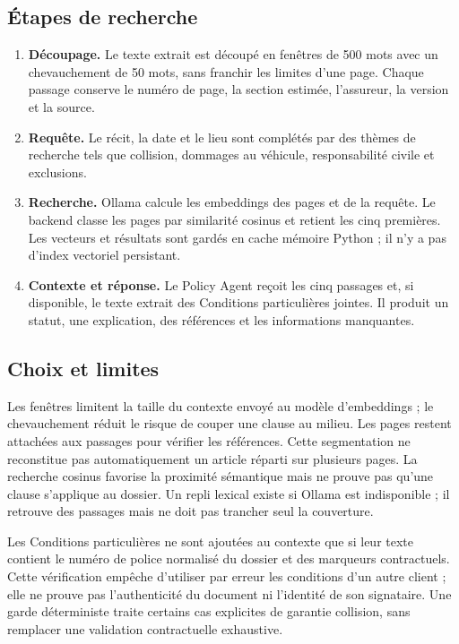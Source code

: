 \documentclass[10pt,a4paper]{article}
\newcommand{\strong}[1]{\textbf{#1}}
\begin{document}
\subsection*{Étapes de recherche}
\begin{enumerate}
\item \strong{Découpage.} Le texte extrait est découpé en fenêtres de 500 mots avec un chevauchement de 50 mots, sans franchir les limites d’une page. Chaque passage conserve le numéro de page, la section estimée, l’assureur, la version et la source.
\item \strong{Requête.} Le récit, la date et le lieu sont complétés par des thèmes de recherche tels que collision, dommages au véhicule, responsabilité civile et exclusions.
\item \strong{Recherche.} Ollama calcule les embeddings des pages et de la requête. Le backend classe les pages par similarité cosinus et retient les cinq premières. Les vecteurs et résultats sont gardés en cache mémoire Python ; il n’y a pas d’index vectoriel persistant.
\item \strong{Contexte et réponse.} Le Policy Agent reçoit les cinq passages et, si disponible, le texte extrait des Conditions particulières jointes. Il produit un statut, une explication, des références et les informations manquantes.
\end{enumerate}

\subsection*{Choix et limites}
Les fenêtres limitent la taille du contexte envoyé au modèle d’embeddings ; le chevauchement réduit le risque de couper une clause au milieu. Les pages restent attachées aux passages pour vérifier les références. Cette segmentation ne reconstitue pas automatiquement un article réparti sur plusieurs pages. La recherche cosinus favorise la proximité sémantique mais ne prouve pas qu’une clause s’applique au dossier. Un repli lexical existe si Ollama est indisponible ; il retrouve des passages mais ne doit pas trancher seul la couverture.

Les Conditions particulières ne sont ajoutées au contexte que si leur texte contient le numéro de police normalisé du dossier et des marqueurs contractuels. Cette vérification empêche d’utiliser par erreur les conditions d’un autre client ; elle ne prouve pas l’authenticité du document ni l’identité de son signataire. Une garde déterministe traite certains cas explicites de garantie collision, sans remplacer une validation contractuelle exhaustive.
\end{document}
